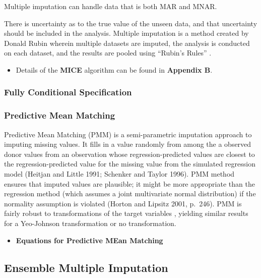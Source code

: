 \documentclass[12pt,]{article}
\providecommand{\tightlist}{%
  \setlength{\itemsep}{0pt}\setlength{\parskip}{0pt}}
\begin{document}
Multiple imputation can handle data that is both MAR and MNAR.

There is uncertainty as to the true value of the unseen data, and that
uncertainty should be included in the analysis. Multiple imputation is a
method created by Donald Rubin wherein multiple datasets are imputed,
the analysis is conducted on each dataset, and the results are pooled
using ``Rubin's Rules'' \citep{rubin_inference_1976}.

\begin{itemize}
\tightlist
\item
  Details of the \textbf{MICE} algorithm can be found in
  \textbf{Appendix B}.
\end{itemize}

\subsubsection{Fully Conditional
Specification}\label{fully-conditional-specification}

\subsubsection{Predictive Mean Matching}\label{predictive-mean-matching}

Predictive Mean Matching (PMM) is a semi-parametric imputation approach
to imputing missing values. It fills in a value randomly from among the
a observed donor values from an observation whose regression-predicted
values are closest to the regression-predicted value for the missing
value from the simulated regression model (Heitjan and Little 1991;
Schenker and Taylor 1996). PMM method ensures that imputed values are
plausible; it might be more appropriate than the regression method
(which assumes a joint multivariate normal distribution) if the
normality assumption is violated (Horton and Lipsitz 2001, p.~246). PMM
is fairly robust to transformations of the target variables
\citep{van_buuren_flexible_2012}, yielding similar results for a
Yeo-Johnson transformation or no transformation.

\begin{itemize}
\tightlist
\item
  \textbf{Equations for Predictive MEan Matching}
\end{itemize}

\subsection{Ensemble Multiple
Imputation}\label{ensemble-multiple-imputation}
\end{document}
